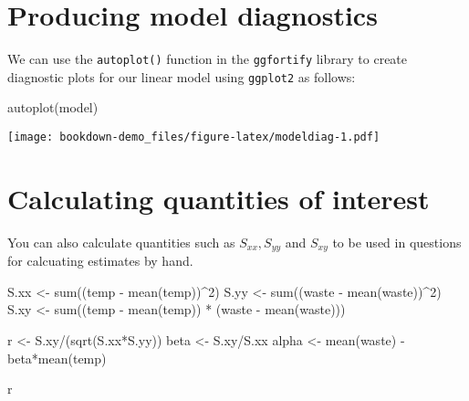 \documentclass[
]{book}
\newenvironment{Shaded}{\begin{snugshade}}{\end{snugshade}}
\newcommand{\DecValTok}[1]{\textcolor[rgb]{0.00,0.00,0.81}{#1}}
\newcommand{\FunctionTok}[1]{\textcolor[rgb]{0.00,0.00,0.00}{#1}}
\newcommand{\NormalTok}[1]{#1}
\newcommand{\OtherTok}[1]{\textcolor[rgb]{0.56,0.35,0.01}{#1}}
\newcommand{\SpecialCharTok}[1]{\textcolor[rgb]{0.00,0.00,0.00}{#1}}
\begin{document}
\hypertarget{producing-model-diagnostics}{%
\section{Producing model diagnostics}\label{producing-model-diagnostics}}

We can use the \texttt{autoplot()} function in the \texttt{ggfortify} library to create diagnostic plots for our linear model using \texttt{ggplot2} as follows:

\begin{Shaded}
\begin{Highlighting}[]
\FunctionTok{autoplot}\NormalTok{(model)}
\end{Highlighting}
\end{Shaded}

\texttt{[image: bookdown-demo\_files/figure-latex/modeldiag-1.pdf]}

\hypertarget{calculating-quantities-of-interest}{%
\section{Calculating quantities of interest}\label{calculating-quantities-of-interest}}

You can also calculate quantities such as \(S_{xx}, S_{yy}\) and \(S_{xy}\) to be used in questions for calcuating estimates by hand.

\begin{Shaded}
\begin{Highlighting}[]
\NormalTok{S.xx }\OtherTok{\textless{}{-}} \FunctionTok{sum}\NormalTok{((temp }\SpecialCharTok{{-}} \FunctionTok{mean}\NormalTok{(temp))}\SpecialCharTok{\^{}}\DecValTok{2}\NormalTok{)}
\NormalTok{S.yy }\OtherTok{\textless{}{-}} \FunctionTok{sum}\NormalTok{((waste }\SpecialCharTok{{-}} \FunctionTok{mean}\NormalTok{(waste))}\SpecialCharTok{\^{}}\DecValTok{2}\NormalTok{)}
\NormalTok{S.xy }\OtherTok{\textless{}{-}} \FunctionTok{sum}\NormalTok{((temp }\SpecialCharTok{{-}} \FunctionTok{mean}\NormalTok{(temp)) }\SpecialCharTok{*}\NormalTok{ (waste }\SpecialCharTok{{-}} \FunctionTok{mean}\NormalTok{(waste)))}

\NormalTok{r }\OtherTok{\textless{}{-}}\NormalTok{ S.xy}\SpecialCharTok{/}\NormalTok{(}\FunctionTok{sqrt}\NormalTok{(S.xx}\SpecialCharTok{*}\NormalTok{S.yy))}
\NormalTok{beta }\OtherTok{\textless{}{-}}\NormalTok{ S.xy}\SpecialCharTok{/}\NormalTok{S.xx}
\NormalTok{alpha }\OtherTok{\textless{}{-}} \FunctionTok{mean}\NormalTok{(waste) }\SpecialCharTok{{-}}\NormalTok{ beta}\SpecialCharTok{*}\FunctionTok{mean}\NormalTok{(temp)}

\NormalTok{r}
\end{Highlighting}
\end{Shaded}
\end{document}
